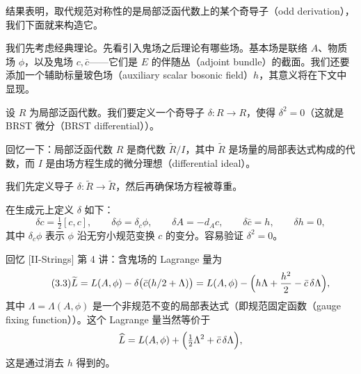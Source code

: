 结果表明，取代规范对称性的是局部泛函代数上的某个奇导子（odd derivation），我们下面就来构造它。

我们先考虑经典理论。先看引入鬼场之后理论有哪些场。基本场是联络 $A$、物质场 $\phi$，以及鬼场 $c,\bar c$——它们是 $E$ 的伴随丛（adjoint bundle）的截面。我们还要添加一个辅助标量玻色场（auxiliary scalar bosonic field）$h$，其意义将在下文中显现。

设 $R$ 为局部泛函代数。我们要定义一个奇导子 $\delta:R\to R$，使得 $\delta^2=0$（这就是 BRST 微分（BRST differential））。

回忆一下：局部泛函代数 $R$ 是商代数 $\widetilde{R}/I$，其中 $\widetilde{R}$ 是场量的局部表达式构成的代数，而 $I$ 是由场方程生成的微分理想（differential ideal）。

我们先定义导子 $\delta:\widetilde{R}\to\widetilde{R}$，然后再确保场方程被尊重。

在生成元上定义 $\delta$ 如下：
\begin{equation}
  \tag{3.2}
  \label{eq:3-2}
  \delta c=\tfrac12[c,c],\qquad \delta\phi=\delta_c\phi,\qquad \delta A=-d_Ac,\qquad \delta\bar c=h,\qquad \delta h=0,
\end{equation}
其中 $\delta_c\phi$ 表示 $\phi$ 沿无穷小规范变换 $c$ 的变分。容易验证 $\delta^2=0$。


回忆 [II-Strings] 第 4 讲：含鬼场的 Lagrange 量为
\begin{equation}
  \tag{3.3}
  \label{eq:3-3}
  \widetilde{L}=L(A,\phi)-\delta\bigl(\bar c(h/2+\Lambda)\bigr)=L(A,\phi)-\Bigl(h\Lambda+\frac{h^2}{2}-\bar c\,\delta\Lambda\Bigr),
\end{equation}
其中 $\Lambda=\Lambda(A,\phi)$ 是一个非规范不变的局部表达式（即规范固定函数（gauge fixing function））。这个 Lagrange 量当然等价于
\[
  \widehat{L}=L(A,\phi)+\Bigl(\tfrac12\Lambda^2+\bar c\,\delta\Lambda\Bigr),
\]
这是通过消去 $h$ 得到的。

